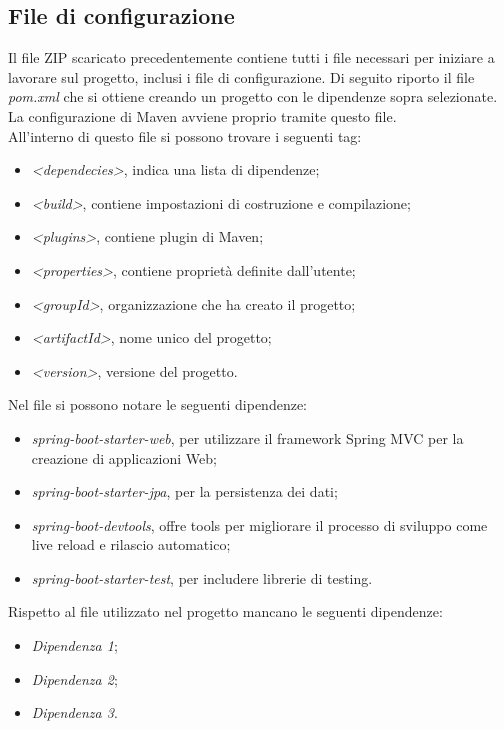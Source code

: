 \subsection{File di configurazione}
Il file ZIP scaricato precedentemente contiene tutti i file necessari per iniziare a lavorare sul progetto, inclusi i file di configurazione.
Di seguito riporto il file \textit{pom.xml} che si ottiene creando un progetto con le dipendenze sopra selezionate. La configurazione di Maven avviene proprio tramite questo file.\\
All'interno di questo file si possono trovare i seguenti tag:
\begin{itemize}
\item \textit{<dependecies>}, indica una lista di dipendenze;
\item \textit{<build>}, contiene impostazioni di costruzione e compilazione;
\item \textit{<plugins>}, contiene plugin di Maven;
\item \textit{<properties>}, contiene proprietà definite dall'utente;
\item \textit{<groupId>}, organizzazione che ha creato il progetto;
\item \textit{<artifactId>}, nome unico del progetto;
\item \textit{<version>},  versione del progetto.
\end{itemize}

\noindent Nel file si possono notare le seguenti dipendenze:
\begin{itemize}
\item \textit{spring-boot-starter-web}, per utilizzare il framework Spring MVC per la creazione di applicazioni Web;
\item \textit{spring-boot-starter-jpa}, per la persistenza dei dati;
\item \textit{spring-boot-devtools}, offre tools per migliorare il processo di sviluppo come live reload e rilascio automatico;
\item \textit{spring-boot-starter-test}, per includere librerie di testing.
\end{itemize}
Rispetto al file utilizzato nel progetto mancano le seguenti dipendenze:
\begin{itemize}
\item \textit{Dipendenza 1};
\item \textit{Dipendenza 2};
\item \textit{Dipendenza 3}.
\end{itemize}

